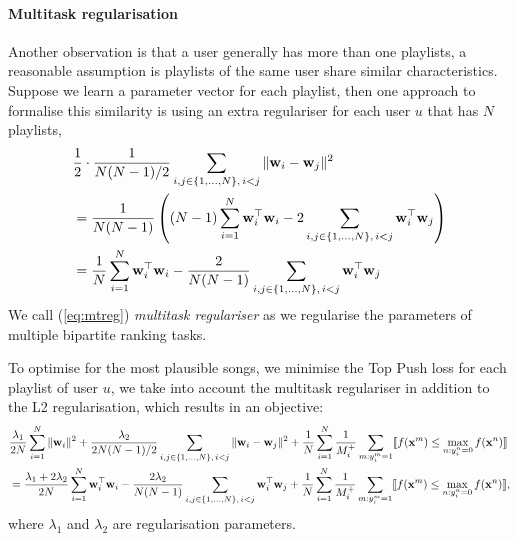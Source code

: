 \paragraph{Multitask regularisation}
Another observation is that a user generally has more than one playlists,
a reasonable assumption is playlists of the same user share similar characteristics. 
Suppose we learn a parameter vector for each playlist, then one approach to formalise this similarity is using an extra regulariser
for each user $u$ that has $N$ playlists,
\begin{equation}
\label{eq:mtreg}
\begin{aligned}
&\frac{1}{2} \cdot \frac{1}{N (N - 1) / 2} \sum_{i, j \in \{1,\dots,N\}, \, i < j} \| \w_i - \w_j \|^2 \\
&= \frac{1}{N (N - 1)} \left( (N - 1) \sum_{i=1}^{N} \w_i^\top \w_i - 2 \sum_{i, j \in \{1,\dots,N\}, \, i < j} \w_i^\top \w_j \right) \\
&= \frac{1}{N} \sum_{i=1}^{N} \w_i^\top \w_i - \frac{2}{N (N - 1)} \sum_{i, j \in \{1,\dots,N\}, \, i < j} \w_i^\top \w_j %
\end{aligned}
\end{equation}
We call (\ref{eq:mtreg}) \emph{multitask regulariser} as we regularise the parameters of multiple bipartite ranking tasks. 

To optimise for the most plausible songs, we minimise the Top Push loss for each playlist of user $u$, 
we take into account the multitask regulariser in addition to the L2 regularisation, 
which results in an objective:
\begin{equation}
\label{eq:mtobj}
\begin{aligned}
&\frac{\lambda_1}{2 N} \sum_{i=1}^{N} \| \mathbf{w}_i \|^2
+ \frac{\lambda_2}{2 N (N - 1) / 2} \sum_{i, j \in \{1,\dots,N\}, \, i < j} \| \mathbf{w}_i - \mathbf{w}_j \|^2 
+ \frac{1}{N} \sum_{i = 1}^{N} \frac{1}{M_i^+} \sum_{m: y_i^m = 1} \llbracket f(\mathbf{x}^m) \le \max_{n: y_i^n = 0} f(\mathbf{x}^n) \rrbracket \\
&= \frac{\lambda_1 + 2\lambda_2}{2 N} \sum_{i=1}^{N} \mathbf{w}_i^\top \mathbf{w}_i 
- \frac{2\lambda_2}{N (N - 1)} \sum_{i, j \in \{1,\dots,N\}, \, i < j} \mathbf{w}_i^\top \mathbf{w}_j
+ \frac{1}{N} \sum_{i = 1}^{N} \frac{1}{M_i^+} \sum_{m: y_i^m = 1} \llbracket f(\mathbf{x}^m) \le \max_{n: y_i^n = 0} f(\mathbf{x}^n) \rrbracket,
\end{aligned}
\end{equation}
where $\lambda_1$ and $\lambda_2$ are regularisation parameters.

